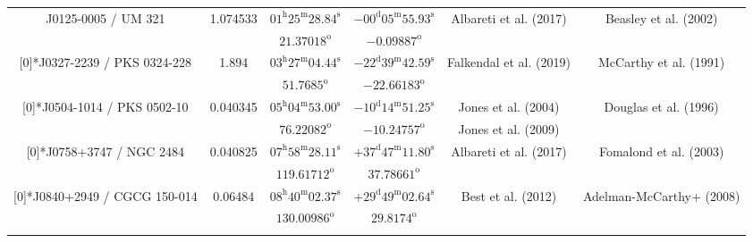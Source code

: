 \begin{landscape}
\begin{longtable}{cccccc}
  \multirow{2}[0]{*}{J0125-0005 / UM 321} & \multirow{2}[0]{*}{ 1.074533 } &  
    $ 01^\text{h}25^\text{m}28.84^\text{s}$  & $-00^\text{d}05^\text{m}55.93^\text{s}$  & 
    \multirow{2}[0]{*}{Albareti et al. (2017) \cite{RedRef9_2017}} & \multirow{2}[0]{*}{Beasley et al. (2002) \cite{CoordRef4_2002}} \\*
        & & $ 21.37018 ^\text{o}$ & $ -0.09887 ^\text{o}$ & & \\ \addlinespace 
  
 
  \multirow{2}[0]{*}{J0327-2239 / PKS 0324-228} & \multirow{2}[0]{*}{ 1.894 } &  
    $03^\text{h}27^\text{m}04.44^\text{s}$  & $ -22^\text{d}39^\text{m}42.59^\text{s} $  & 
    \multirow{2}[0]{*}{Falkendal et al. (2019) \cite{RedRef16_2019}} & \multirow{2}[0]{*}{McCarthy et al. (1991) \cite{CoordRef16_1991}} \\*
  & & $ 51.7685 ^\text{o}$ & $ -22.66183 ^\text{o}$ & & \\ \addlinespace 
  

    \multirow{2}[0]{*}{J0504-1014 / PKS 0502-10} & \multirow{2}[0]{*}{ 0.040345 } &  
    $ 05^\text{h}04^\text{m}53.00^\text{s} $  & $ -10^\text{d}14^\text{m}51.25^\text{s} $  & 
    Jones et al. (2004) \cite{RedRef0_2004}  & \multirow{2}[0]{*}{Douglas et al. (1996) \cite{CoordRef10_1996}} \\*
    & & $ 76.22082 ^\text{o}$ & $ -10.24757 ^\text{o}$ & Jones et al. (2009)\cite{RedRef0_2009} & \\ \addlinespace 
  
 \multirow{2}[0]{*}{J0758+3747 / NGC 2484} & \multirow{2}[0]{*}{0.040825} &  
    $ 07^\text{h}58^\text{m}28.11^\text{s}$  & $+37^\text{d}47^\text{m}11.80^\text{s}$  & 
    \multirow{2}[0]{*}{Albareti et al. (2017) \cite{RedRef9_2017}}& \multirow{2}[0]{*}{Fomalond et al. (2003) \cite{CoordRef25_2003}} \\*
    & & $ 119.61712 ^\text{o}$ & $ 37.78661 ^\text{o}$ & & \\ \addlinespace 
 
 \multirow{2}[0]{*}{J0840+2949 / CGCG 150-014} & \multirow{2}[0]{*}{0.06484} &  
    $ 08^\text{h}40^\text{m}02.37^\text{s}$  & $+29^\text{d}49^\text{m}02.64^\text{s}$  & 
    \multirow{2}[0]{*}{Best et al. (2012) \cite{RedRef28_2012}}& \multirow{2}[0]{*}{Adelman-McCarthy+ (2008) \cite{CoordRef28_2008}} \\*
    & & $ 130.00986 ^\text{o}$ & $ 29.8174 ^\text{o}$ & & \\ \addlinespace 



\end{longtable}
\end{landscape}
